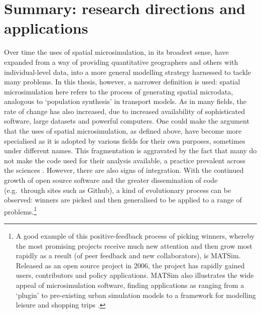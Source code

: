 \section{Summary: research directions and applications}
\label{s:bigdata-gps}
Over time the uses of spatial microsimulation, in its broadest sense,
have expanded from a way of
providing quantitative geographers and others with individual-level data, into a more
general modelling strategy harnessed to tackle many problems.
In this thesis, however, a narrower definition is used:
spatial microsimulation here refers to the process of generating spatial
microdata, analogous to `population synthesis' in transport models.
As in many fields, the
rate of change has also increased, due to increased availability of
sophisticated software, large datasets and powerful
computers. One could make the argument that the
uses of spatial microsimulation, as defined above, have become more specialised
as it is adopted by various fields for their own purposes, sometimes under
different names. This fragmentation is aggravated by the fact that
many do not make the code used for their analysis available, a
practice prevalent across the sciences \citep{Ince2012}.
However, there are also signs of integration. With the continued growth of
open source software and the greater dissemination of code
(e.g.~through sites such as Github), a kind of evolutionary process can be observed:
winners are picked and then generalised to be applied to a range of
problems.\footnote{A
good example of this positive-feedback process of picking winners, whereby
the most promising projects receive much new attention and then grow most
rapidly as a result (of peer feedback and new collaborators), is MATSim.
Released as an open source project in 2006, the project has rapidly gained
users, contributors and policy applications. MATSim also illustrates the
wide appeal of microsimulation software, finding applications as ranging from
a `plugin' to pre-existing urban simulation models to a framework for
modelling leisure and shopping trips \citep{Nicolai2012-matsim, horni2009location}.
}

